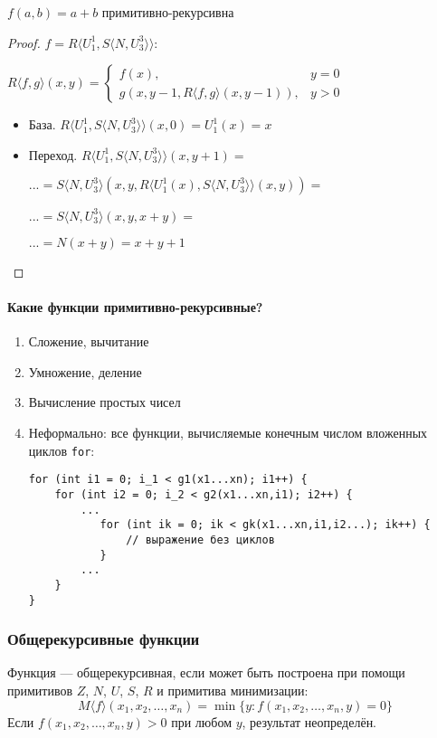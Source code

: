\begin{lemma}
$f(a,b) = a+b$ примитивно-рекурсивна
\end{lemma}
\begin{proof} $f = R \langle U^1_1, S\langle N, U^3_3\rangle \rangle$:

$R\langle f,g\rangle(x,y)
=\left\{\begin{array}{ll}
  f(x), &y=0\\
  g(x,y-1,R\langle f,g\rangle (x,y-1)), &y > 0
\end{array}\right.$

\begin{itemize}
\item База. $R\langle U^1_1, S\langle N, U^3_3\rangle \rangle(x,0) = U^1_1(x) = x$

\item Переход. $R\langle U^1_1, S\langle N, U^3_3\rangle \rangle(x,y+1) = $

$... = S\langle N, U^3_3\rangle (x,y,R\langle U^1_1(x), S\langle N, U^3_3\rangle\rangle (x,y) ) =$

$... = S\langle N, U^3_3\rangle (x,y,x + y) = $

$... = N(x+y) = x+y+1$
\end{itemize}

\end{proof}


\paragraph{Какие функции примитивно-рекурсивные?}
\begin{enumerate}
\item Сложение, вычитание
\item Умножение, деление
\item Вычисление простых чисел
\item Неформально: все функции, вычисляемые конечным числом вложенных циклов \verb!for!:

\begin{verbatim}
for (int i1 = 0; i_1 < g1(x1...xn); i1++) {
    for (int i2 = 0; i_2 < g2(x1...xn,i1); i2++) {
        ...
           for (int ik = 0; ik < gk(x1...xn,i1,i2...); ik++) {
               // выражение без циклов
           }
        ...
    }
}
\end{verbatim}
\end{enumerate}


\subsubsection{Общерекурсивные функции}
\begin{definition}
Функция --- общерекурсивная, если может быть построена при помощи
примитивов $Z$, $N$, $U$, $S$, $R$ и примитива минимизации:
$$M\langle f \rangle (x_1,x_2,\dots,x_n) = \min\{y: f(x_1,x_2,\dots,x_n,y) = 0\}$$
Если $f(x_1,x_2,\dots,x_n,y) > 0$ при любом $y$, результат неопределён.
\end{definition}

